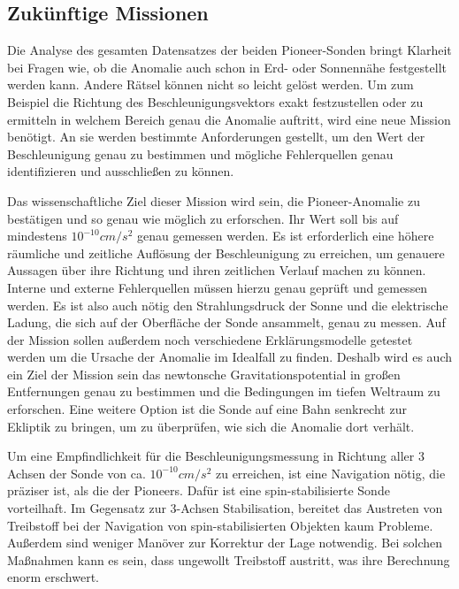 \subsection{Zuk\"unftige Missionen}

Die Analyse des gesamten Datensatzes der beiden Pioneer-Sonden bringt
Klarheit bei Fra\-gen wie, ob die Anomalie auch schon in Erd- oder
Sonnenn\"ahe festgestellt werden kann. Andere R\"atsel k\"onnen nicht
so leicht gel\"ost werden. Um zum Beispiel die Richtung des
Be\-schleunigungsvektors exakt festzustellen oder zu ermitteln in
welchem Bereich genau die Anomalie auftritt, wird eine neue Mission
ben\"otigt. An sie werden bestimmte Anforderun\-gen gestellt\cite{alle2005}\cite{Nieto2004b}\cite{Turyshev2004b}\cite{Nieto2004},
 um den Wert der Beschleunigung genau zu bestimmen
und m\"ogliche Fehlerquellen genau identifizieren und ausschlie{\ss}en
zu k\"onnen.



Das wissenschaftliche Ziel dieser Mission wird sein, die
Pioneer-Anomalie zu best\"atigen und so genau wie m\"oglich zu
erforschen. Ihr Wert soll bis auf mindestens
$10^{-10}\mathit{cm}/s^{2}$ ge\-nau gemessen werden. Es ist
erforderlich eine h\"ohere r\"aumliche und zeitliche Aufl\"osung der
Beschleunigung zu erreichen, um genauere Aussagen \"uber ihre Richtung
und ihren zeitlichen Verlauf machen zu k\"onnen. Interne und externe
Fehlerquellen m\"ussen hierzu genau gepr\"uft und gemessen werden. Es 
ist also auch nötig den Strahlungsdruck der Sonne und
die elektrische Ladung, die sich auf der Oberfl\"ache der
Son\-de ansammelt, genau zu messen. Auf der Mission sollen au{\ss}erdem noch
verschiedene Erkl\"arungsmodelle ge\-testet werden um die Ursache der
Anomalie im Idealfall zu finden. Deshalb wird es auch ein Ziel der Mission sein das newtonsche
Gravitationspotential in gro{\ss}en Entfernungen genau zu bestimmen und
die Bedingungen im tiefen Weltraum zu erforschen. Eine weitere Option
ist die Sonde auf eine Bahn senkrecht zur Ekliptik zu bringen, um
zu \"uberpr\"ufen, wie sich die Anomalie dort verh\"alt.



Um eine Empfindlichkeit f\"ur die Beschleunigungsmessung in Richtung
aller 3 Achsen der Sonde von ca. $10^{-10}\mathit{cm}/s^{2}$ zu
erreichen, ist eine Navigation n\"otig, die pr\"aziser ist, als die der
Pioneers. Daf\"ur ist eine spin-stabilisierte Sonde vorteilhaft. Im
Gegensatz zur 3-Achsen Stabilisation, bereitet das Austreten von
Treibstoff bei der Navigation von spin-stabilisier\-ten Objekten kaum
Probleme. Au{\ss}erdem sind weniger Man\"over zur Korrektur der Lage
notwendig. Bei solchen Ma{\ss}nahmen kann es sein, dass
ungewollt Treibstoff aus\-tritt, was ihre Berechnung enorm erschwert.




